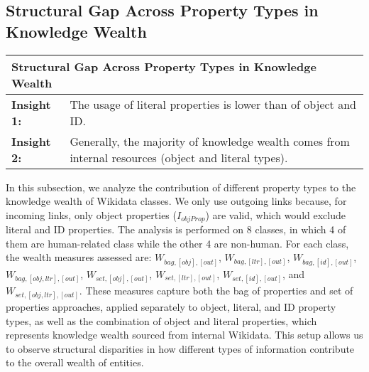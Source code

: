 \subsection{Structural Gap Across Property Types in Knowledge Wealth} \label{wealth & proptype contribution}

\begin{table}[h]
    \centering
    \renewcommand{\arraystretch}{1.3}
    \begin{tabular}{|l p{12cm}|} 
        \hline
        \multicolumn{2}{|l|}{\textbf{Structural Gap Across Property Types in Knowledge Wealth}} \\
        \hline
        \textbf{Insight 1:} & The usage of literal properties is lower than
        of object and ID.\\
        \textbf{Insight 2:} & Generally, the majority of knowledge wealth comes from internal resources (object and literal types). \\
        \hline
    \end{tabular}
\end{table}

In this subsection, we analyze the contribution of different property types to the knowledge wealth of Wikidata classes. We only use outgoing links because, for incoming links, only object properties (\(I_{objProp}\)) are valid, which would exclude literal and ID properties. The analysis is performed on 8 classes, in which 4 of them are human-related class while the other 4 are non-human. For each class, the wealth measures assessed are: \(W_{bag,[obj],[out]}\), \(W_{bag,[ltr],[out]}\), \(W_{bag,[id],[out]}\), \(W_{bag,[obj, ltr],[out]}\), \(W_{set,[obj],[out]}\), \(W_{set,[ltr],[out]}\), \(W_{set,[id],[out]}\), and \(W_{set,[obj, ltr],[out]}\). These measures capture both the bag of properties and set of properties approaches, applied separately to object, literal, and ID property types, as well as the combination of object and literal properties, which represents knowledge wealth sourced from internal Wikidata. This setup allows us to observe structural disparities in how different types of information contribute to the overall wealth of entities.

